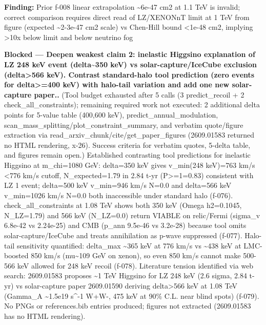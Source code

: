 \documentclass[11pt,a4paper]{article}
\begin{document}
\textbf{Finding:} Prior f-008 linear extrapolation \textasciitilde{}6e-47 cm2 at 1.1 TeV is invalid; correct comparison requires direct read of LZ/XENONnT limit at 1 TeV from figure (expected \textasciitilde{}2-3e-47 cm2 scale) vs Chen-Hill bound \textless{}1e-48 cm2, implying \textgreater{}10x below limit and below neutrino fog

\textbf{Blocked --- Deepen weakest claim 2: inelastic Higgsino explanation of LZ 248 keV event (delta\textasciitilde{}350 keV) vs solar-capture/IceCube exclusion (delta\textgreater{}566 keV). Contrast standard-halo tool prediction (zero events for delta\textgreater{}=400 keV) with halo-tail variation and add one new solar-capture paper..} (Tool budget exhausted after 5 calls (3 predict\_recoil + 2 check\_all\_constraints); remaining required work not executed: 2 additional delta points for 5-value table (400,600 keV), predict\_annual\_modulation, scan\_mass\_splitting/plot\_constraint\_summary, and verbatim quote/figure extraction via read\_arxiv\_chunk/cite/get\_paper\_figures (2609.01583 returned no HTML rendering, x-26). Success criteria for verbatim quotes, 5-delta table, and figures remain open.) Established contrasting tool predictions for inelastic Higgsino at m\_chi=1080 GeV: delta=350 keV gives v\_min(248 keV)=763 km/s \textless{}776 km/s cutoff, N\_expected=1.79 in 2.84 t-yr (P\textgreater{}=1=0.83) consistent with LZ 1 event; delta=500 keV v\_min=946 km/s N=0.0 and delta=566 keV v\_min=1026 km/s N=0.0 both inaccessible under standard halo (f-076). check\_all\_constraints at 1.08 TeV shows both 350 keV (Omega h2=0.1045, N\_LZ=1.79) and 566 keV (N\_LZ=0.0) return VIABLE on relic/Fermi (sigma\_v 6.8e-42 vs 2.24e-25) and CMB (p\_ann 9.5e-46 vs 3.2e-28) because tool omits solar-capture/IceCube and treats annihilation as p-wave suppressed (f-077). Halo-tail sensitivity quantified: delta\_max \textasciitilde{}365 keV at 776 km/s vs \textasciitilde{}438 keV at LMC-boosted 850 km/s (mu\textasciitilde{}109 GeV on xenon), so even 850 km/s cannot make 500-566 keV allowed for 248 keV recoil (f-078). Literature tension identified via web search: 2609.01583 proposes \textasciitilde{}1 TeV Higgsino for LZ 248 keV (2.6 sigma, 2.84 t-yr) vs solar-capture paper 2609.01590 deriving delta\textgreater{}566 keV at 1.08 TeV (Gamma\_A \textasciitilde{}1.5e19 s\textasciicircum{}-1 W+W-, 475 keV at 90\% C.L. near blind spots) (f-079). No PNGs or references.bib entries produced; figures not extracted (2609.01583 has no HTML rendering).
\end{document}

